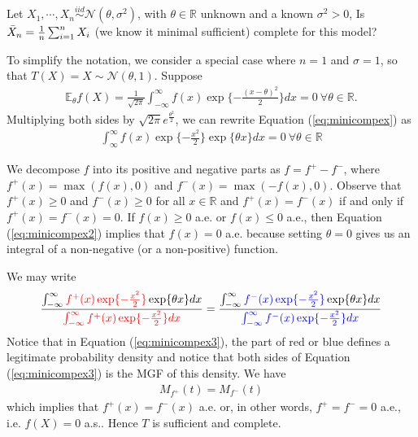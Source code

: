 \begin{example}
    Let $X_1,\cdots,X_n\overset{iid}{\sim}\mathcal{N}(\theta,\sigma^2)$, with $\theta\in\mathbb{R}$ unknown and 
    a known $\sigma^2>0$, Is $\Bar{X}_n=\frac{1}{n}\sum_{i=1}^nX_i$ 
    (we know it minimal sufficient) complete for this model?

    To simplify the notation, we consider a special case where $n=1$ and $\sigma=1$,
    so that $T(X)=X\sim \mathcal{N}(\theta,1)$. Suppose
    \begin{gather}
        \mathbb{E}_\theta f(X)
        =\frac{1}{\sqrt{2\pi}}\int_{-\infty}^\infty{f(x)\exp\{-\frac{(x-\theta)^2}{2}\}}dx=0
        ~\forall\theta\in\mathbb{R}.\label{eq:minicompex}
    \end{gather}
    Multiplying both sides by $\sqrt{2\pi}e^\frac{\theta^2}{2}$,
    we can rewrite Equation (\ref{eq:minicompex}) as 
    \begin{gather}
        \int_{\infty}^\infty{f(x)\exp\{ -\frac{x^2}{2}\}\exp\{\theta x\}}dx=0
        ~\forall{\theta}\in\mathbb{R}\label{eq:minicompex2}
    \end{gather}
    
    We decompose $f$ into its positive and negative parts as $f=f^+-f^-$, 
    where $f^+(x)=\max(f(x),0)$ and $f^-(x)=\max(-f(x),0)$.
    Observe that $f^+(x)\geq 0$ and $f^-(x)\geq 0$ for all $x\in\mathbb{R}$ and
    $f^+(x)=f^-(x)$ if and only if $f^+(x)=f^-(x)=0$.
    If $f(x)\geq 0$ a.e. or $f(x)\leq 0$ a.e., 
    then Equation (\ref{eq:minicompex2}) implies that $f(x)=0$ a.e. because
    setting $\theta=0$ gives us an integral of a non-negative (or a non-positive) function.

    We may write
    \begin{gather}
        \frac{\int_{-\infty}^\infty{\color{red}f^+(x)\exp\{-\frac{x^2}{2}\}}\exp\{\theta x\}dx}
        {\color{red}\int_{-\infty}^\infty f^+(x)\exp\{-\frac{x^2}{2}\}dx}
        =
        \frac{\int_{-\infty}^\infty{\color{blue}f^-(x)\exp\{-\frac{x^2}{2}\}}\exp\{\theta x\}dx}
        {\color{blue}\int_{-\infty}^\infty f^-(x)\exp\{-\frac{x^2}{2}\}dx}
        \label{eq:minicompex3}
    \end{gather}
    Notice that in Equation (\ref{eq:minicompex3}), 
    the part of {\color{red} red} or {\color{blue} blue} defines a legitimate probability density and 
    notice that both sides of Equation (\ref{eq:minicompex3}) is the MGF of this density. We have 
    \begin{gather}
        M_{f^+}(t)=M_{f^-}(t)
    \end{gather}
    which implies that $f^+(x)=f^-(x)$ a.e. or, in other words, 
    $f^+=f^-=0$ a.e., i.e. $f(X)=0$ a.s.. 
    Hence $T$ is sufficient and complete.
\end{example}

